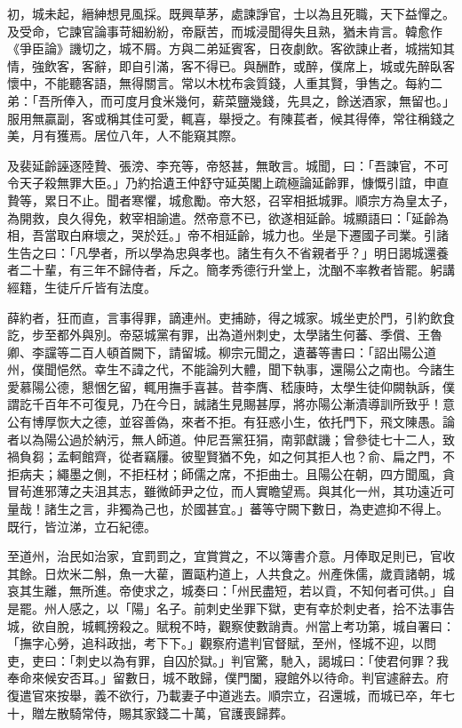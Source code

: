 \begin{pinyinscope}
 初，城未起，縉紳想見風採。既興草茅，處諫諍官，士以為且死職，天下益憚之。及受命，它諫官論事苛細紛紛，帝厭苦，而城浸聞得失且熟，猶未肯言。韓愈作《爭臣論》譏切之，城不屑。方與二弟延賓客，日夜劇飲。客欲諫止者，城揣知其情，強飲客，客辭，即自引滿，客不得已。與酬酢，或醉，僕席上，城或先醉臥客懷中，不能聽客語，無得關言。常以木枕布衾質錢，人重其賢，爭售之。每約二弟：「吾所俸入，而可度月食米幾何，薪菜鹽幾錢，先具之，餘送酒家，無留也。」服用無贏副，客或稱其佳可愛，輒喜，舉授之。有陳萇者，候其得俸，常往稱錢之美，月有獲焉。居位八年，人不能窺其際。



 及裴延齡誣逐陸贄、張滂、李充等，帝怒甚，無敢言。城聞，曰：「吾諫官，不可令天子殺無罪大臣。」乃約拾遺王仲舒守延英閣上疏極論延齡罪，慷慨引誼，申直贄等，累日不止。聞者寒懼，城愈勵。帝大怒，召宰相抵城罪。順宗方為皇太子，為開救，良久得免，敕宰相諭遣。然帝意不已，欲遂相延齡。城顯語曰：「延齡為相，吾當取白麻壞之，哭於廷。」帝不相延齡，城力也。坐是下遷國子司業。引諸生告之曰：「凡學者，所以學為忠與孝也。諸生有久不省親者乎？」明日謁城還養者二十輩，有三年不歸侍者，斥之。簡孝秀德行升堂上，沈酗不率教者皆罷。躬講經籍，生徒斤斤皆有法度。



 薛約者，狂而直，言事得罪，謫連州。吏捕跡，得之城家。城坐吏於門，引約飲食訖，步至都外與別。帝惡城黨有罪，出為道州刺史，太學諸生何蕃、季償、王魯卿、李讜等二百人頓首闕下，請留城。柳宗元聞之，遺蕃等書曰：「詔出陽公道州，僕聞悒然。幸生不諱之代，不能論列大體，聞下執事，還陽公之南也。今諸生愛慕陽公德，懇悃乞留，輒用撫手喜甚。昔李膺、嵇康時，太學生徒仰闕執訴，僕謂訖千百年不可復見，乃在今日，誠諸生見賜甚厚，將亦陽公漸漬導訓所致乎！意公有博厚恢大之德，並容善偽，來者不拒。有狂惑小生，依托門下，飛文陳愚。論者以為陽公過於納污，無人師道。仲尼吾黨狂狷，南郭獻譏；曾參徒七十二人，致禍負芻；孟軻館齊，從者竊屨。彼聖賢猶不免，如之何其拒人也？俞、扁之門，不拒病夫；繩墨之側，不拒枉材；師儒之席，不拒曲士。且陽公在朝，四方聞風，貪冒茍進邪薄之夫沮其志，雖微師尹之位，而人實瞻望焉。與其化一州，其功遠近可量哉！諸生之言，非獨為己也，於國甚宜。」蕃等守闕下數日，為吏遮抑不得上。既行，皆泣涕，立石紀德。



 至道州，治民如治家，宜罰罰之，宜賞賞之，不以簿書介意。月俸取足則已，官收其餘。日炊米二斛，魚一大雚，置甌杓道上，人共食之。州產侏儒，歲貢諸朝，城哀其生離，無所進。帝使求之，城奏曰：「州民盡短，若以貢，不知何者可供。」自是罷。州人感之，以「陽」名子。前刺史坐罪下獄，吏有幸於刺史者，拾不法事告城，欲自脫，城輒搒殺之。賦稅不時，觀察使數誚責。州當上考功第，城自署曰：「撫字心勞，追科政拙，考下下。」觀察府遣判官督賦，至州，怪城不迎，以問吏，吏曰：「刺史以為有罪，自囚於獄。」判官驚，馳入，謁城曰：「使君何罪？我奉命來候安否耳。」留數日，城不敢歸，僕門闔，寢館外以待命。判官遽辭去。府復遣官來按舉，義不欲行，乃載妻子中道逃去。順宗立，召還城，而城已卒，年七十，贈左散騎常侍，賜其家錢二十萬，官護喪歸葬。




\end{pinyinscope}
